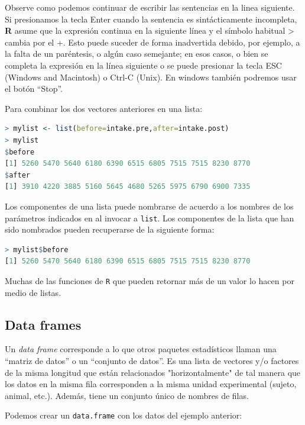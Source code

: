 \documentclass[spanish]{extbook}
\numberwithin{equation}{section}
\numberwithin{figure}{section}
\begin{document}
Observe como podemos continuar de escribir las sentencias en la linea
siguiente. Si presionamos la tecla Enter cuando la sentencia es sintácticamente
incompleta, \textbf{R} asume que la expresión continua en la siguiente línea y el
símbolo habitual > cambia por el +. Esto puede suceder de forma inadvertida
debido, por ejemplo, a la falta de un paréntesis, o algún caso semejante; en
esos casos, o bien se completa la expresión en la línea siguiente o se puede
presionar la tecla ESC (Windows and Macintosh) o Ctrl-C (Unix). En windows
también podremos usar el botón ``Stop''. 

Para combinar los dos vectores anteriores en una lista:

\begin{lstlisting}[language=R]
> mylist <- list(before=intake.pre,after=intake.post)
> mylist
$before
[1] 5260 5470 5640 6180 6390 6515 6805 7515 7515 8230 8770
$after
[1] 3910 4220 3885 5160 5645 4680 5265 5975 6790 6900 7335
\end{lstlisting}

Los componentes de una lista puede nombrarse de acuerdo a los nombres de los
parámetros indicados en al invocar a \texttt{list}. Los componentes de la lista
que han sido nombrados pueden recuperarse de la siguiente forma:

\begin{lstlisting}[language=R]
> mylist$before
[1] 5260 5470 5640 6180 6390 6515 6805 7515 7515 8230 8770
\end{lstlisting}

Muchas de las funciones de \texttt{R} que pueden retornar más de un valor lo
hacen por medio de listas.

\subsection{Data frames}

Un \textit{data frame} corresponde a lo que otros paquetes estadísticos llaman
una ``matriz de datos'' o un ``conjunto de datos''. Es una lista de vectores y/o
factores de la misma longitud que están relacionados "horizontalmente" de tal manera
que los datos en la misma fila corresponden a la misma unidad experimental
(sujeto, animal, etc.). Además, tiene un conjunto único de nombres de filas.

Podemos crear un \texttt{data.frame} con los datos del ejemplo anterior:
\end{document}
